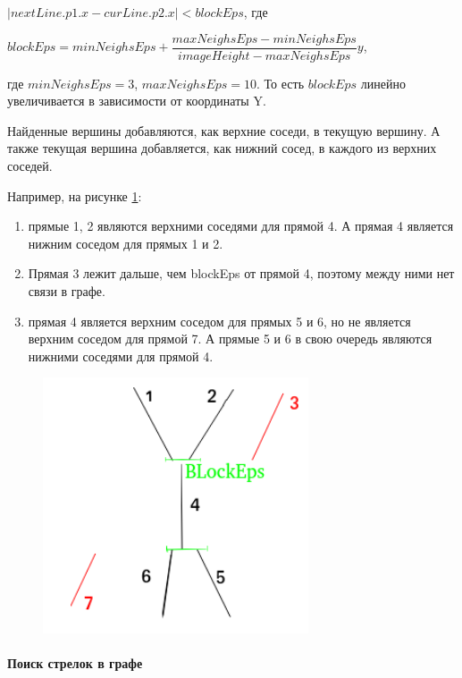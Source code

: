 $|nextLine.p1.x - curLine.p2.x| < blockEps$, где  

$blockEps = minNeighsEps + \dfrac{maxNeighsEps - minNeighsEps}{imageHeight - maxNeighsEps}y$, 

где  $minNeighsEps = 3$, $maxNeighsEps = 10$. То есть $blockEps$ линейно увеличивается в зависимости от координаты Y.

Найденные вершины добавляются, как верхние соседи, в текущую вершину. А также текущая вершина добавляется, как нижний сосед, в каждого из верхних соседей.

Например, на рисунке \ref{fig:neighscheck}:
\begin{enumerate}
	\item прямые 1, 2 являются верхними соседями для прямой 4. А прямая 4 является нижним соседом для прямых 1 и 2.
	\item Прямая 3 лежит дальше, чем blockEps от прямой 4, поэтому между ними нет связи в графе.
	\item прямая 4 является верхним соседом для прямых 5 и 6, но не является верхним соседом для прямой 7. А прямые 5 и 6 в свою очередь являются нижними соседями для прямой 4.
\end{enumerate}
\begin{figure}[!h]
	\centering
	\includegraphics[width=0.7\textwidth]{pictures/neighs_check}
	\caption[Создание ребер]{}
	\label{fig:neighscheck}
\end{figure}

\paragraph{Поиск стрелок в графе}

